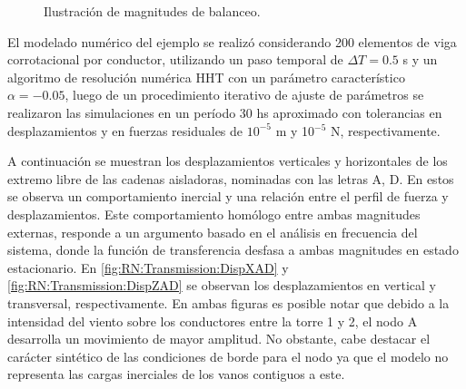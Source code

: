\begin{figure}[htbp]
	\centering
	\def\svgwidth{80mm}
	
	\caption{Ilustración de magnitudes de balanceo.}
	\label{fig:RN:Transmission:Angulo}
\end{figure}

El modelado numérico del ejemplo se realizó considerando 200 elementos de viga corrotacional por conductor, utilizando un paso temporal de $\Delta T =0.5$ s y un algoritmo de resolución numérica HHT con un parámetro característico $\alpha=-0.05$, luego de un procedimiento iterativo de ajuste de parámetros se realizaron las simulaciones en un período 30 hs aproximado con tolerancias en desplazamientos y en fuerzas residuales de $10^{-5}$ m y 10$^{-5}$ N, respectivamente.

A continuación se muestran los desplazamientos verticales y horizontales de los extremo libre de las cadenas aisladoras, nominadas con las letras $\text{A}$, $\text{D}$. En estos se observa un comportamiento inercial y una relación entre el perfil de fuerza y desplazamientos. Este comportamiento homólogo entre ambas magnitudes externas, responde a un argumento basado en el análisis en frecuencia del sistema, donde la función de transferencia desfasa a ambas magnitudes en estado estacionario. En \ref{fig:RN:Transmission:DispXAD} y \ref{fig:RN:Transmission:DispZAD} se observan los desplazamientos en vertical y transversal, respectivamente. En ambas figuras es posible notar que debido a la intensidad del viento sobre los conductores entre la torre 1 y 2, el nodo $\text{A}$ desarrolla un movimiento de mayor amplitud. No obstante, cabe destacar el carácter sintético de las condiciones de borde para el nodo ya que el modelo no representa las cargas inerciales de los vanos contiguos a este. 


